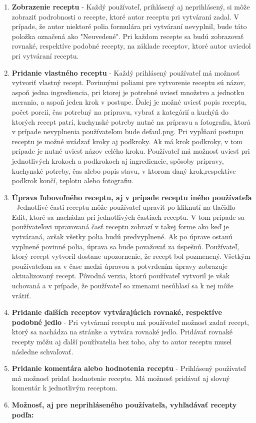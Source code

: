 \begin{enumerate}
\item \textbf{Zobrazenie receptu} - Každý používateľ, prihlásený aj neprihlásený, si môže zobraziť podrobnosti o recepte, ktoré autor receptu pri vytváraní zadal. V prípade, že autor niektoré polia formulára pri vytváraní nevyplnil, bude táto položka označená ako "Neuvedené". Pri každom recepte sa budú zobrazovať rovnaké, respektíve podobné recepty, na základe receptov, ktoré autor uviedol pri vytváraní receptu. 
\item \textbf{Pridanie vlastného receptu} - Každý prihlásený používateľ má možnosť vytvoriť vlastný recept. Povinnými poliami pre vytvorenie receptu sú názov, aspoň jedna ingrediencia, pri ktorej je potrebné uviesť množstvo a jednotku merania, a aspoň jeden krok v postupe. Ďalej je možné uviesť popis receptu, počet porcií, čas potrebný na prípravu, vybrať z kategórií a kuchýň do ktorých recept patrí, kuchynské potreby nutné na prípravu a fotografiu, ktorá v prípade nevyplnenia používateľom bude defaul.png. Pri vypĺňaní postupu receptu je možné uvádzať kroky aj podkroky. Ak má krok podkroky, v tom prípade je nutné uviesť názov celého kroku. Používateľ má možnosť uviesť pri jednotlivých krokoch a podkrokoch aj ingrediencie, spôsoby prípravy, kuchynské potreby, čas alebo popis stavu, v ktorom daný krok,respektíve podkrok končí, teplotu alebo fotografiu.
\item \textbf{Úprava ľubovoľného receptu, aj v prípade receptu iného používateľa} - Jednotlivé časti receptu môže používateľ upraviť po kliknutí na tlačidlo Edit, ktoré sa nachádza pri jednotlivých častiach receptu. V tom prípade sa používateľovi upravovaná časť receptu zobrazí v takej forme ako keď je vytváraná, avšak všetky polia budú predvyplnené. Ak po úprave ostanú vyplnené povinné polia, úprava sa bude považovať za úspešnú. Používateľ, ktorý recept vytvoril dostane upozornenie, že recept bol pozmenený. Všetkým používateľom sa v čase medzi úpravou a potvrdením úpravy zobrazuje aktualizovaný recept. Pôvodná verzia, ktorú používateľ vytvoril je však uchovaná a v prípade, že používateľ so zmenami nesúhlasí sa k nej môže vrátiť.
\item \textbf{Pridanie ďalších receptov vytvárajúcich rovnaké, respektíve podobné jedlo} - Pri vytváraní receptu má používateľ možnosť zadať recept, ktorý sa nachádza na stránke a vytvára rovnaké jedlo. Pridávať rovnaké recepty môžu aj ďalší používatelia bez toho, aby to autor receptu musel následne schvaľovať.
\item \textbf{Pridanie komentára alebo hodnotenia receptu} - Prihlásený používateľ má možnosť pridať hodnotenie receptu. Má možnosť pridávať aj slovný komentár k jednotlivým receptom.
\item \textbf{Možnosť, aj pre neprihláseného používateľa, vyhľadávať recepty podľa:} 


\end{enumerate}
